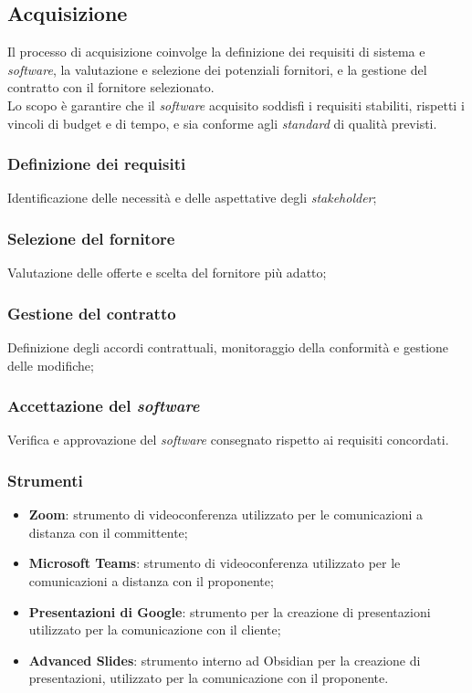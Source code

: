 \subsection{Acquisizione}

Il processo di acquisizione coinvolge la definizione dei requisiti di sistema e
\textit{software}, la valutazione e selezione dei potenziali fornitori, e la gestione del
contratto con il fornitore selezionato.\\
Lo scopo è garantire che il \textit{software} acquisito soddisfi i requisiti stabiliti, rispetti i
vincoli di budget e di tempo, e sia conforme agli \textit{standard} di qualità previsti.

\subsubsection{Definizione dei requisiti} 
Identificazione delle necessità e delle aspettative degli \textit{stakeholder};

\subsubsection{Selezione del fornitore} 
Valutazione delle offerte e scelta del fornitore più adatto;

\subsubsection{Gestione del contratto} 
Definizione degli accordi contrattuali, monitoraggio della conformità e gestione 
delle modifiche;

\subsubsection{Accettazione del \textit{software}} 
Verifica e approvazione del \textit{software} consegnato rispetto ai requisiti 
concordati.

\subsubsection{Strumenti}
\begin{itemize}
	\item \textbf{Zoom}: strumento di videoconferenza utilizzato per le comunicazioni a distanza con il committente;
	\item \textbf{Microsoft Teams}: strumento di videoconferenza utilizzato per le comunicazioni a distanza con il proponente;
	\item \textbf{Presentazioni di Google}: strumento per la creazione di presentazioni utilizzato per la comunicazione con il cliente;
	\item \textbf{Advanced Slides}: strumento interno ad Obsidian per la creazione di presentazioni, utilizzato per la comunicazione con il proponente.
\end{itemize}
